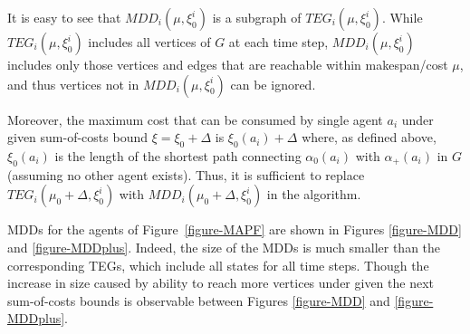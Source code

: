 \documentclass[jair,oneside,11pt]{article}
\begin{document}
It is easy to see that $MDD_i(\mu, \xi^i_0)$ is a subgraph of $TEG_i(\mu,\xi^i_0)$. While $TEG_i(\mu,\xi^i_0)$ includes all vertices of $G$ at each time step, $MDD_i(\mu,\xi^i_0)$ includes only those vertices and edges that are reachable within makespan/cost $\mu$, and thus vertices not in $MDD_i(\mu,\xi^i_0)$ can be ignored.


Moreover, the maximum cost that can be consumed by single agent $a_i$ under given sum-of-costs bound $\xi=\xi_0 + \Delta$ is $\xi_0(a_i) + \Delta$ where, as defined above, $\xi_0(a_i)$ is the length of the shortest path connecting $\alpha_0(a_i)$ with $\alpha_+(a_i)$ in $G$ (assuming no other agent exists). Thus, it is sufficient to replace $TEG_i(\mu_0+\Delta,\xi^i_0)$ with $MDD_i(\mu_0+\Delta,\xi^i_0)$ in the algorithm.


MDDs for the agents of Figure~\ref{figure-MAPF} are shown in Figures \ref{figure-MDD} and \ref{figure-MDDplus}. Indeed, the size of the MDDs is much smaller than the corresponding TEGs, which include all states for all time steps. Though the increase in size caused by ability to reach more vertices under given the next  sum-of-costs bounds is observable between Figures \ref{figure-MDD} and \ref{figure-MDDplus}.
\end{document}
